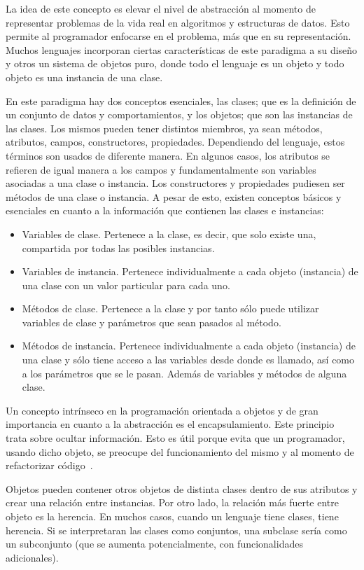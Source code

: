 \documentclass[12pt,letterpaper,titlepage,oneside,openright]{book}
\begin{document}
La idea de este concepto es elevar el nivel de abstracción al momento de representar problemas de la vida real en algoritmos y estructuras de datos. Esto permite al programador enfocarse en el problema, más que en su representación. Muchos lenguajes incorporan ciertas características de este paradigma a su diseño y otros un sistema de objetos puro, donde todo el lenguaje es un objeto y todo objeto es una instancia de una clase.

En este paradigma hay dos conceptos esenciales, las clases; que es la definición de un conjunto de datos y comportamientos, y los objetos; que son las instancias de las clases. Los mismos pueden tener distintos miembros, ya sean métodos, atributos, campos, constructores, propiedades. Dependiendo del lenguaje, estos términos son usados de diferente manera. En algunos casos, los atributos se refieren de igual manera a los campos y fundamentalmente son variables asociadas a una clase o instancia. Los constructores y propiedades pudiesen ser métodos de una clase o instancia. A pesar de esto, existen conceptos básicos y esenciales en cuanto a la información que contienen las clases e instancias:

\begin{itemize}
    \item Variables de clase. Pertenece a la clase, es decir, que solo existe una, compartida por todas las posibles instancias.
    \item Variables de instancia. Pertenece individualmente a cada objeto (instancia) de una clase con un valor particular para cada uno.
    \item Métodos de clase. Pertenece a la clase y por tanto sólo puede utilizar variables de clase y parámetros que sean pasados al método.
    \item Métodos de instancia. Pertenece individualmente a cada objeto (instancia) de una clase y sólo tiene acceso a las variables desde donde es llamado, así como a los parámetros que se le pasan. Además de variables y métodos de alguna clase.
\end{itemize}

\vfill
Un concepto intrínseco en la programación orientada a objetos y de gran importancia en cuanto a la abstracción es el encapsulamiento. Este principio trata sobre ocultar información. Esto es útil porque evita que un programador, usando dicho objeto, se preocupe del funcionamiento del mismo y al momento de refactorizar código~\cite{scott2000programming}.

\vfill
Objetos pueden contener otros objetos de distinta clases dentro de sus atributos y crear una relación entre instancias. Por otro lado, la relación más fuerte entre objeto es la herencia. En muchos casos, cuando un lenguaje tiene clases, tiene herencia. Si se interpretaran las clases como conjuntos, una subclase sería como un subconjunto (que se aumenta potencialmente, con funcionalidades adicionales).
\end{document}
